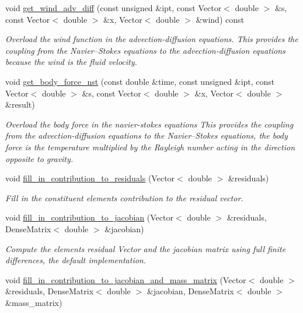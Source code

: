 \begin{DoxyCompactItemize}
void \hyperlink{classoomph_1_1RefineableBuoyantQCrouzeixRaviartElement_a093f484b86df6e7cb59d4cc9e605fb51}{get\+\_\+wind\+\_\+adv\+\_\+diff} (const unsigned \&ipt, const Vector$<$ double $>$ \&s, const Vector$<$ double $>$ \&x, Vector$<$ double $>$ \&wind) const
\begin{DoxyCompactList}\small\item\em Overload the wind function in the advection-\/diffusion equations. This provides the coupling from the Navier--Stokes equations to the advection-\/diffusion equations because the wind is the fluid velocity. \end{DoxyCompactList}\item 
void \hyperlink{classoomph_1_1RefineableBuoyantQCrouzeixRaviartElement_a69fb9113989d692dd55eb1983cdbc93b}{get\+\_\+body\+\_\+force\+\_\+nst} (const double \&time, const unsigned \&ipt, const Vector$<$ double $>$ \&s, const Vector$<$ double $>$ \&x, Vector$<$ double $>$ \&result)
\begin{DoxyCompactList}\small\item\em Overload the body force in the navier-\/stokes equations This provides the coupling from the advection-\/diffusion equations to the Navier--Stokes equations, the body force is the temperature multiplied by the Rayleigh number acting in the direction opposite to gravity. \end{DoxyCompactList}\item 
void \hyperlink{classoomph_1_1RefineableBuoyantQCrouzeixRaviartElement_a102b3aeb79d9af430b9ce0a7c8d5bd33}{fill\+\_\+in\+\_\+contribution\+\_\+to\+\_\+residuals} (Vector$<$ double $>$ \&residuals)
\begin{DoxyCompactList}\small\item\em Fill in the constituent elements\textquotesingle{} contribution to the residual vector. \end{DoxyCompactList}\item 
void \hyperlink{classoomph_1_1RefineableBuoyantQCrouzeixRaviartElement_a0d05a727999c7f102f3fe2bacce38f6b}{fill\+\_\+in\+\_\+contribution\+\_\+to\+\_\+jacobian} (Vector$<$ double $>$ \&residuals, Dense\+Matrix$<$ double $>$ \&jacobian)
\begin{DoxyCompactList}\small\item\em Compute the element\textquotesingle{}s residual Vector and the jacobian matrix using full finite differences, the default implementation. \end{DoxyCompactList}\item 
void \hyperlink{classoomph_1_1RefineableBuoyantQCrouzeixRaviartElement_a06f1e2dbdf7a8ebaa964d421aee453ee}{fill\+\_\+in\+\_\+contribution\+\_\+to\+\_\+jacobian\+\_\+and\+\_\+mass\+\_\+matrix} (Vector$<$ double $>$ \&residuals, Dense\+Matrix$<$ double $>$ \&jacobian, Dense\+Matrix$<$ double $>$ \&mass\+\_\+matrix)

\end{DoxyCompactItemize}
